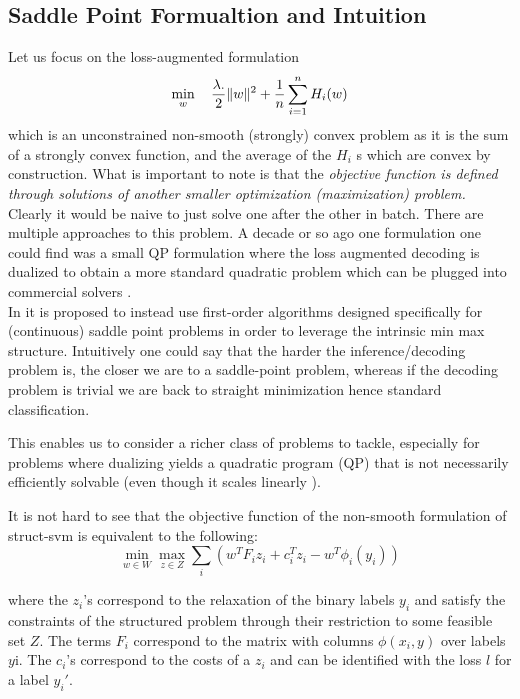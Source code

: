 \subsection{Saddle Point Formualtion and Intuition}
Let us focus on the loss-augmented formulation
\begin{equation}
  \min_{w} \quad \frac{\lambda .}{2} \lVert w\rVert^2+ \frac{1}{n}\sum_{i=1}^nH_i(w)
\end{equation}
which is an unconstrained non-smooth (strongly) convex problem
as it is the sum of a strongly convex function, and the average of
the $H_i$ s which are convex by construction.
What is important to note is that the \emph{objective function is defined
through solutions of another smaller optimization (maximization) problem.}
Clearly it would be naive to just solve one after the other in batch. There are
multiple approaches to this problem. A decade or so ago one formulation one could find
was a small QP formulation where the loss augmented decoding is dualized to
obtain a more standard quadratic problem which can be plugged into commercial
solvers \citep{taskarStructuredPredictionDual2006}.\\

In \citet{taskarStructuredPredictionDual2006} it is proposed to instead use
first-order algorithms designed specifically for (continuous) saddle point
problems in order to leverage the intrinsic min max structure. Intuitively one
could say that the harder the inference/decoding problem is, the closer we are
to a saddle-point problem, whereas if the decoding problem is trivial we are
back to straight minimization hence standard classification.

This enables us to consider a richer class of problems to tackle, especially for
problems where dualizing yields a quadratic program (QP) that is not necessarily
efficiently solvable (even though it scales linearly
\cite{taskarStructuredPredictionDual2006}).

It is not hard to see that the objective function of the non-smooth formulation
of struct-svm is equivalent to the following:
\begin{equation}
  \min_{ w \in {W}} \max_{ z \in {Z}} \sum_i \left( 
w^T  F_i  z_i +  c_i^T  z_i -  w^T  \phi _i( y_i)
\right)
  \label{saddle_point}
\end{equation}

where the $ z_i$'s correspond to the relaxation of the binary labels $y_i$ and
satisfy the constraints of the structured problem through their restriction
to some feasible set $Z$. The terms $ F_i$ correspond to the matrix with columns
$\phi( x_i, y)$ over labels $ y$i. The $ c_i$'s correspond to the costs of a $
z_i$ and can be identified with the loss $l$ for a label $ y_i'$.

